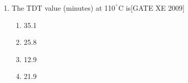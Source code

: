 \documentclass[journal,12pt,onecolumn]{IEEEtran}
\theoremstyle{remark}
\begin{document}
\begin{enumerate}
\begin{multicols}{2}
\begin{enumerate}
\item 9.91
\item 9.19
\item 1.99
\item 0.19
\end{enumerate}
\end{multicols}

\item The TDT value (minutes) at 110$^\degree$C is\hfill[GATE XE 2009]

\begin{multicols}{2}
\begin{enumerate}
\item 35.1
\item 25.8
\item 12.9
\item 21.9
\end{enumerate}
\end{multicols}

\end{enumerate}

 
\end{document}
